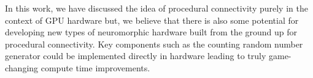 \documentclass[9pt,twocolumn,twoside,lineno]{pnas-new}
\begin{document}
In this work, we have discussed the idea of procedural connectivity purely in the context of GPU hardware but, we believe that there is also some potential for developing new types of neuromorphic hardware built from the ground up for procedural connectivity.
Key components such as the counting random number generator could be implemented directly in hardware leading to truly game-changing compute time improvements.

\end{document}
